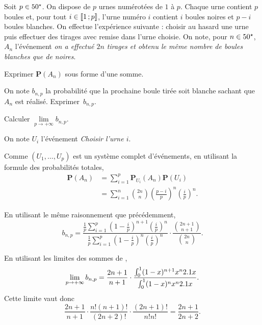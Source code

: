 \begin{exercice}
Soit $p \in 50^\star$. On dispose de $p$ urnes numérotées de $1$ à $p$. Chaque urne contient $p$ boules et, pour tout $i \in \llbracket 1\,; p \rrbracket$, l'urne numéro $i$ contient $i$ boules noires et $p - i$ boules blanches. On effectue l'expérience suivante : choisir au hasard une urne puis effectuer des tirages avec remise dans l'urne choisie. On note, pour $n \in 50^\star$, $A_n$ l'événement \textit{on a effectué $2 n$ tirages et obtenu le même nombre de boules blanches que de noires}.

\begin{questions}
\item Exprimer $\mathbf{P}(A_n)$ sous forme d'une somme.

\item On note $b_{n,p}$ la probabilité que la prochaine boule tirée soit blanche sachant que $A_n$ est réalisé. Exprimer~$b_{n,p}$.
\item Calculer $\lim\limits_{p\to+\infty} b_{n,p}$.
\end{questions}
\end{exercice}

\begin{solution}
On note $U_i$ l'événement \textit{Choisir l'urne $i$}.
\begin{reponses}
\item Comme $(U_1,\ldots,U_p)$ est un système complet d'événements, en utilisant la formule des probabilités totales,
\begin{align*}
\mathbf{P}(A_n) &= \sum_{i=1}^p \mathbf{P}_{U_i}(A_n) \mathbf{P}(U_i) \\
&= \sum_{i=1}^n \binom{2n}{n} \left(\frac{p-i}{p}\right)^n \left(\frac{i}{p}\right)^n.
\end{align*}

\item En utilisant le même raisonnement que précédemment,
\[
b_{n,p}
= \frac{\frac{1}{p} \sum\limits_{i=1}^p \left(1 - \frac{i}{p}\right)^{n+1} \left(\frac{i}{p}\right)^n}{\frac{1}{p} \sum\limits_{i=1}^p \left(1 - \frac{i}{p}\right)^{n} \left(\frac{i}{p}\right)^n} \cdot \frac{\binom{2n+1}{n+1}}{\binom{2n}{n}}.
\]

\item En utilisant les limites des sommes de ,
\[
\lim\limits_{p\to+\infty} b_{n,p} = \frac{2n+1}{n+1} \cdot \frac{\int_0^1 (1 - x)^{n+1} x^n 2.1 x}{\int_0^1 (1 - x)^n x^n 2.1 x}.
\]
Cette limite vaut donc
\[
\frac{2n+1}{n+1} \cdot \frac{n! (n+1)!}{(2n+2)!} \cdot \frac{(2n+1)!}{n! n!}  = \frac{2n+1}{2n+2}.
\]
\end{reponses}
\end{solution}

